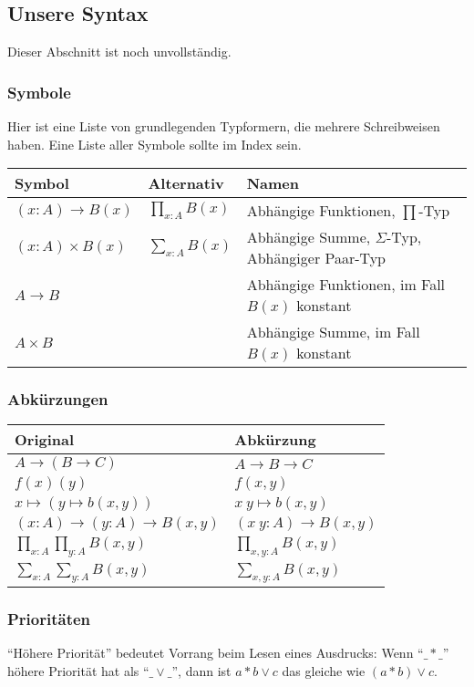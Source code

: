 \subsection{Unsere Syntax}
Dieser Abschnitt ist noch unvollständig.

\subsubsection{Symbole}
Hier ist eine Liste von grundlegenden Typformern, die mehrere Schreibweisen haben.
Eine Liste aller Symbole sollte im Index sein.
\begin{center}
  \begin{tabular}{lll}
    Symbol & Alternativ & Namen \\
    \midrule
  $(x:A)\to B(x)$ & $\prod_{x:A}B(x)$ & Abhängige Funktionen, $\prod$-Typ \\
    $(x:A)\times B(x)$ & $\sum_{x:A}B(x)$ & Abhängige Summe, $\Sigma$-Typ, Abhängiger Paar-Typ \\
    $A\to B$ & & Abhängige Funktionen, im Fall $B(x)$ konstant \\
    $A\times B$ & & Abhängige Summe, im Fall $B(x)$ konstant
  \end{tabular}
\end{center}

\subsubsection{Abkürzungen}
\begin{center}
  \begin{tabular}{ll}
    Original & Abkürzung \\
    \midrule
    $A\to (B\to C)$ & $A\to B\to C$ \\
    $f(x)(y)$ & $f(x,y)$ \\
    $x\mapsto (y\mapsto b(x,y))$ & $x\ y \mapsto b(x,y)$ \\
    $(x:A) \to (y : A) \to B(x,y)$ & $(x\ y : A)\to B(x,y)$ \\
    $\prod_{x:A}\prod_{y:A}B(x,y)$ & $\prod_{x,y:A}B(x,y)$ \\
    $\sum_{x:A}\sum_{y:A}B(x,y)$ & $\sum_{x,y:A}B(x,y)$
  \end{tabular}
\end{center}

\subsubsection{Prioritäten}
``Höhere Priorität'' bedeutet Vorrang beim Lesen eines Ausdrucks: Wenn ``$\_\ast\_$'' höhere Priorität hat als ``$\_\vee\_$'', dann ist $a\ast b \vee c$ das gleiche wie $(a\ast b) \vee c$.


